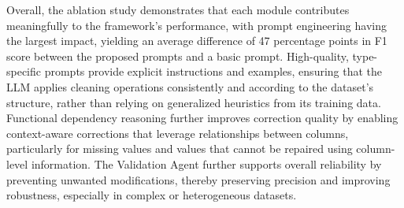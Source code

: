 \begin{table}[h]
\centering
{}
\caption{Runtime (s) and token usage across datasets.}
\label{tab:ablation_study}
\end{table}

Overall, the ablation study demonstrates that each module contributes meaningfully to the framework's performance, with prompt engineering having the largest impact, yielding an average difference of 47 percentage points in F1 score between the proposed prompts and a basic prompt.
High-quality, type-specific prompts provide explicit instructions and examples, ensuring that the LLM applies cleaning operations consistently and according to the dataset's structure, rather than relying on generalized heuristics from its training data. 
Functional dependency reasoning further improves correction quality by enabling context-aware corrections that leverage relationships between columns, particularly for missing values and values that cannot be repaired using column-level information.
The Validation Agent further supports overall reliability by preventing unwanted modifications, thereby preserving precision and improving robustness, especially in complex or heterogeneous datasets.
